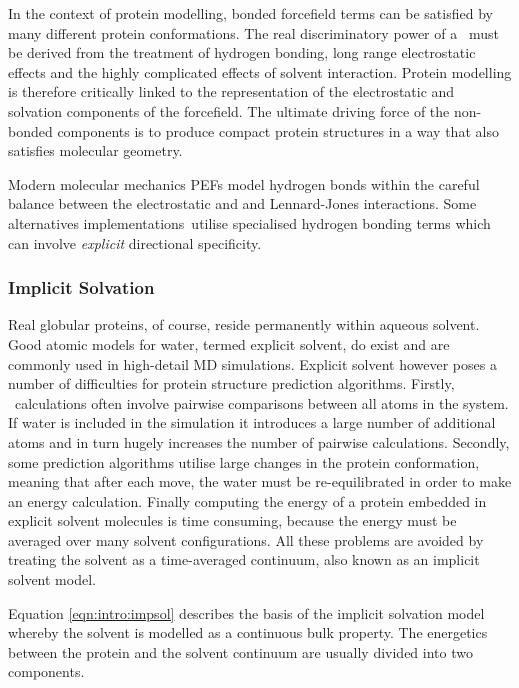 In the context of protein modelling, bonded forcefield terms can be satisfied by many different protein conformations.
 The real discriminatory power of a \forcefield\ must be derived from the treatment of hydrogen bonding, long range electrostatic effects and the highly complicated effects of solvent interaction. Protein modelling  is therefore critically linked to the representation of the electrostatic and solvation components of the forcefield.
The ultimate  driving force of the non-bonded components is to produce compact protein structures in a way that also satisfies molecular geometry.    

Modern molecular mechanics PEFs model hydrogen bonds within the careful balance
between the electrostatic and and Lennard-Jones interactions. Some alternatives
 implementations\ utilise specialised hydrogen bonding terms which can involve \emph{explicit} directional specificity.

\subsubsection{Implicit Solvation}
\label{section:protmodel:implicit_solvation}

Real globular proteins, of course, reside permanently within aqueous solvent. Good
atomic models for water, termed explicit solvent, do exist and are commonly used in high-detail MD simulations. Explicit solvent however poses a number of difficulties for protein structure prediction algorithms. Firstly, \forcefield\ calculations often involve pairwise comparisons between all atoms in the
system. If water is included
in the simulation  it introduces a large number of additional atoms and in
turn hugely increases the number of pairwise calculations.
Secondly, some prediction algorithms utilise  large changes in the protein conformation, meaning that after each move, the water must be re-equilibrated in order to make an energy calculation. Finally computing the energy of a protein embedded in explicit
solvent molecules is time consuming, because the energy
must be averaged over many solvent configurations. All these problems are avoided by treating the solvent as a time-averaged continuum, also known as an implicit solvent model. 

Equation \ref{eqn:intro:impsol} describes the basis of the implicit solvation model whereby the solvent is modelled as a continuous bulk property. The energetics between the protein and the solvent continuum are usually divided into two components. 

